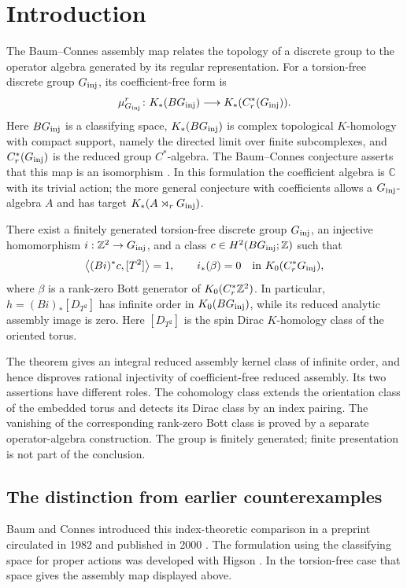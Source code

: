 \section{Introduction}
\label{sec:introduction}

The Baum--Connes assembly map relates the topology of a discrete group to
the operator algebra generated by its regular representation.  For a
torsion-free discrete group $G_{\mathrm{inj}}$, its coefficient-free form is
\[
  \mu_{G_{\mathrm{inj}}}^r\colon K_*(BG_{\mathrm{inj}})\longrightarrow K_*(C_r^*(G_{\mathrm{inj}})).
\]
Here $BG_{\mathrm{inj}}$ is a classifying space, $K_*(BG_{\mathrm{inj}})$ is complex topological
$K$-homology with compact support, namely the directed limit over finite
subcomplexes, and $C_r^*(G_{\mathrm{inj}})$ is the reduced group $C^*$-algebra.  The
Baum--Connes conjecture asserts that this map is an isomorphism
\cite{BCH94}.  In this formulation the coefficient algebra is
$\mathbb C$ with its trivial action; the more general conjecture with
coefficients allows a $G_{\mathrm{inj}}$-algebra $A$ and has target $K_*(A\rtimes_r G_{\mathrm{inj}})$.

\begin{theorem}\label{thm:main}
There exist a finitely generated torsion-free discrete group \(G_{\mathrm{inj}}\), an injective homomorphism \(i:\mathbb Z^2\to G_{\mathrm{inj}}\), and a class \(c\in H^2(BG_{\mathrm{inj}};\mathbb Z)\) such that
\[
\left\langle(Bi)^*c,[T^2]\right\rangle=1,\qquad
i_*(\beta)=0\quad\text{in }K_0(C_r^* G_{\mathrm{inj}}),
\]
where \(\beta\) is a rank-zero Bott generator of \(K_0(C_r^*\mathbb Z^2)\).
In particular, \(h=(Bi)_*[D_{T^2}]\) has infinite order in \(K_0(BG_{\mathrm{inj}})\), while its reduced analytic assembly image is zero. Here \([D_{T^2}]\) is the spin Dirac \(K\)-homology class of the oriented torus.
\end{theorem}

The theorem gives an integral reduced assembly kernel class of infinite
order, and hence disproves rational injectivity of coefficient-free reduced
assembly. Its two assertions have different roles. The cohomology class
extends the orientation class of the embedded torus and detects its Dirac
class by an index pairing. The vanishing of the corresponding rank-zero
Bott class is proved by a separate operator-algebra construction.
The group is finitely generated; finite presentation is not part of the
conclusion.

\subsection{The distinction from earlier counterexamples}

Baum and Connes introduced this index-theoretic comparison in a preprint
circulated in 1982 and published in 2000
\cite[Section~1 and editors' note]{BC00}. The formulation using the
classifying space for proper actions was developed with Higson
\cite[Conjecture~3.15]{BCH94}. In the torsion-free case that space gives
the assembly map displayed above.

